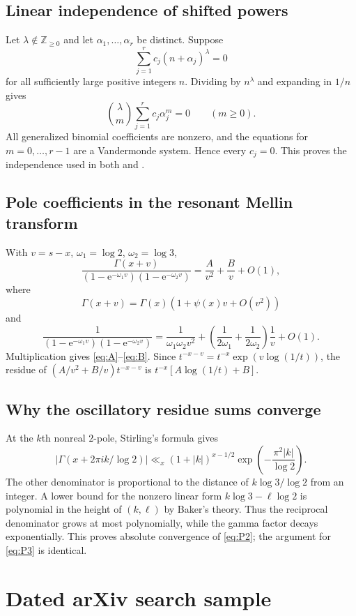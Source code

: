 \documentclass[11pt]{article}
\numberwithin{equation}{section}
\theoremstyle{definition}
\theoremstyle{remark}
\newcommand{\Z}{\mathbb{Z}}
\newcommand{\e}{\mathrm{e}}
\begin{document}
\subsection{Linear independence of shifted powers}
Let $\lambda\notin\Z_{\ge0}$ and let $\alpha_1,\ldots,\alpha_r$ be distinct.  Suppose
\[
 \sum_{j=1}^r c_j(n+\alpha_j)^\lambda=0
\]
for all sufficiently large positive integers $n$.  Dividing by $n^\lambda$ and expanding in $1/n$ gives
\[
 \binom{\lambda}{m}\sum_{j=1}^r c_j\alpha_j^m=0\qquad(m\ge0).
\]
All generalized binomial coefficients are nonzero, and the equations for $m=0,\ldots,r-1$ are a Vandermonde system.  Hence every $c_j=0$.  This proves the independence used in both  and .

\subsection{Pole coefficients in the resonant Mellin transform}
With $v=s-x$, $\omega_1=\log2$, $\omega_2=\log3$,
\[
 \frac{\Gamma(x+v)}{(1-\e^{-\omega_1v})(1-\e^{-\omega_2v})}
 =\frac{A}{v^2}+\frac{B}{v}+O(1),
\]
where
\[
 \Gamma(x+v)=\Gamma(x)(1+\psi(x)v+O(v^2))
\]
and
\[
 \frac1{(1-\e^{-\omega_1v})(1-\e^{-\omega_2v})}
 =\frac1{\omega_1\omega_2v^2}
 +\left(\frac1{2\omega_1}+\frac1{2\omega_2}\right)\frac1v+O(1).
\]
Multiplication gives \eqref{eq:A}--\eqref{eq:B}.  Since
$t^{-x-v}=t^{-x}\exp(v\log(1/t))$, the residue of
$(A/v^2+B/v)t^{-x-v}$ is
$t^{-x}[A\log(1/t)+B]$.

\subsection{Why the oscillatory residue sums converge}
At the $k$th nonreal $2$-pole, Stirling's formula gives
\[
 |\Gamma(x+2\pi i k/\log2)|
 \ll_x (1+|k|)^{x-1/2}\exp\!\left(-\frac{\pi^2|k|}{\log2}\right).
\]
The other denominator is proportional to the distance of
$k\log3/\log2$ from an integer.  A lower bound for the nonzero linear form
$k\log3-\ell\log2$ is polynomial in the height of $(k,\ell)$ by Baker's theory.  Thus the reciprocal denominator grows at most polynomially, while the gamma factor decays exponentially.  This proves absolute convergence of \eqref{eq:P2}; the argument for \eqref{eq:P3} is identical.

\section{Dated arXiv search sample}
\label{app:arxiv}
\end{document}
